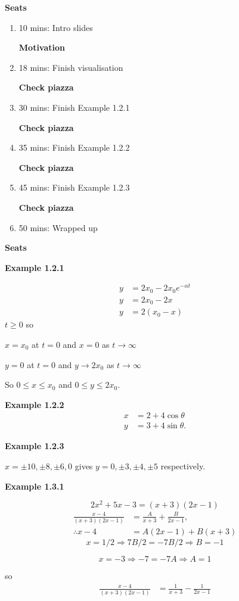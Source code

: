 \textbf{Seats}
\begin{enumerate}
    \item 10 mins: Intro slides \par
    \textbf{Motivation}
    \item 18 mins: Finish visualisation \par
    \textbf{Check piazza}
    \item 30 mins: Finish Example 1.2.1 \par
    \textbf{Check piazza}
    \item 35 mins: Finish Example 1.2.2 \par
    \textbf{Check piazza}
    \item 45 mins: Finish Example 1.2.3 \par
    \textbf{Check piazza}
    \item 50 mins: Wrapped up
\end{enumerate}
\textbf{Seats}

\vspace{10mm}
\textbf{Example 1.2.1}

\begin{align*}
y &= 2x_0 - 2x_0 e^{-\alpha t}\\
y &= 2x_0 - 2x\\
y &= 2(x_0 - x)
\end{align*}
$t \geq 0$ so \par
$x = x_0$ at $t=0$ and $x=0$ as $t\rightarrow\infty$ \par
$y = 0$ at $t=0$ and $y \rightarrow 2 x_0$ as $t\rightarrow\infty$ \par
So $0 \leq x \leq x_0$ and $0 \leq y \leq 2x_0$.

\vspace{10mm}
\textbf{Example 1.2.2}
\begin{align*}
    x&=2+4\cos\theta\\
    y&=3+4\sin\theta.
\end{align*}

\vspace{10mm}
\textbf{Example 1.2.3}

$x = \pm10, \pm8, \pm6, 0$ gives
$y = 0, \pm3, \pm4, \pm 5$ respectively.

\newpage
\textbf{Example 1.3.1}

$$2x^2+5x-3 = (x+3)(2x-1)$$
\begin{align*}
\frac{x - 4}{(x+3)(2x-1)} &= \frac{A}{x+3} + \frac{B}{2x-1},\\
\therefore x-4 &= A(2x-1) + B(x+3)
\end{align*}
$$x=1/2 \Rightarrow 7B/2 =-7B/2 \Rightarrow B=-1 $$ \par
$$x=-3 \Rightarrow -7 = -7A \Rightarrow A=1$$ \par
so 
\begin{align*}
\frac{x - 4}{(x+3)(2x-1)} &= \frac{1}{x+3} - \frac{1}{2x-1}
\end{align*}


